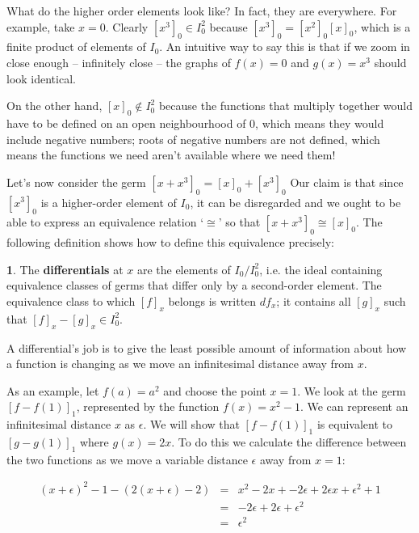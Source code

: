 \documentclass[oneside,english]{amsbook}
\numberwithin{section}{chapter}
\theoremstyle{plain}
\theoremstyle{definition}
\newtheorem{defn}[thm]{\protect\definitionname}
\providecommand{\definitionname}{Definition}
\begin{document}
			What do the higher order elements look like? In fact, they are everywhere. For example, take $x = 0$. Clearly $[x^3]_0\in I_0^2$ because $[x^3]_0 = [x^2]_0[x]_0$, which is a finite product of elements of $I_0$. An intuitive way to say this is that if we zoom in close enough -- infinitely close -- the graphs of $f(x) = 0$ and $g(x) = x^3$ should look identical. 
						
			On the other hand, $[x]_0\notin I_0^2$ because the functions that multiply together would have to be defined on an open neighbourhood of $0$, which means they would include negative numbers; roots of negative numbers are not defined, which means the functions we need aren't available where we need them! 
			
			Let's now consider the germ $[x + x^3]_0 = [x]_0 + [x^3]_0$ Our claim is that since $[x^3]_0$ is a higher-order element of $I_0$, it can be disregarded and we ought to be able to express an equivalence relation `$\cong$' so that $[x + x^3]_0 \cong [x]_0$. The following definition shows how to define this equivalence precisely:

			\begin{defn}
				The \textbf{differentials} at $x$ are the elements of $I_0/I_0^2$, i.e. the ideal containing equivalence classes of germs that differ only by a second-order element. The equivalence class to which $[f]_x$ belongs is written $df_x$; it contains all $[g]_x$ such that $[f]_x - [g]_x \in I_0^2$.
			\end{defn}
			
			A differential's job is to give the least possible amount of information about how a function is changing as we move an infinitesimal distance away from $x$.
			
			As an example, let $f(a) = a^2$ and choose the point $x = 1$. We look at the germ $[f - f(1)]_1$, represented by the function $f(x) =  x^2 - 1$. We can represent an infinitesimal distance $x$ as $\epsilon$. We will show that $[f - f(1)]_1$ is equivalent to  $[g - g(1)]_1$ where $g(x) = 2x$. To do this we calculate the difference between the two functions as we move a variable distance $\epsilon$ away from $x = 1$:

			\begin{align}[rcl]
				(x + \epsilon)^2 - 1 - (2(x + \epsilon) - 2) &=& x^2 - 2x + - 2\epsilon + 2\epsilon x + \epsilon^2 +1 \\
                                           &=& - 2\epsilon + 2\epsilon + \epsilon^2 \\
                                           &=& \epsilon^2
			\end{align}
\end{document}
